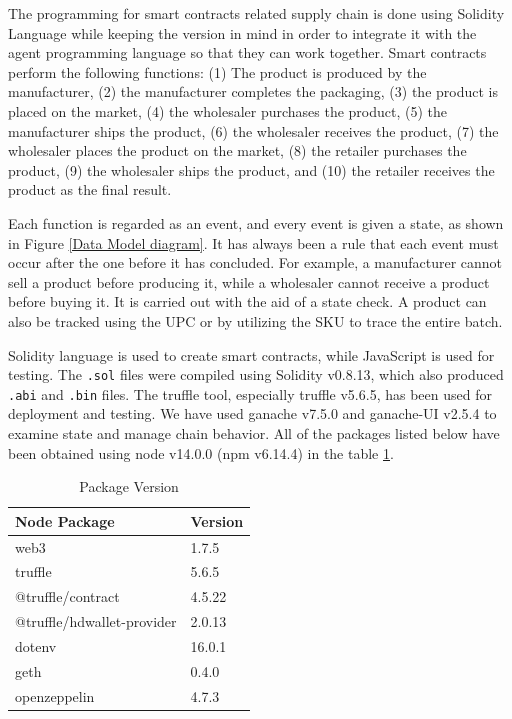 \vspace{.5cm}

The programming for smart contracts related supply chain is done using Solidity Language while keeping the version in mind in order to integrate it with the agent programming language so that they can work together. Smart contracts perform the following functions: (1) The product is produced by the manufacturer, (2) the manufacturer completes the packaging, (3) the product is placed on the market, (4) the wholesaler purchases the product, (5) the manufacturer ships the product, (6) the wholesaler receives the product, (7) the wholesaler places the product on the market, (8) the retailer purchases the product, (9) the wholesaler ships the product, and (10) the retailer receives the product as the final result.

\vspace{.5cm}

Each function is regarded as an event, and every event is given a state, as shown in Figure \ref{Data Model diagram}. It has always been a rule that each event must occur after the one before it has concluded. For example, a manufacturer cannot sell a product before producing it, while a wholesaler cannot receive a product before buying it. It is carried out with the aid of a state check. A product can also be tracked using the \ac{UPC} or by utilizing the \ac{SKU} to trace the entire batch.

\vspace{.5cm}

Solidity language is used to create smart contracts, while JavaScript is used for testing. The \texttt{.sol} files were compiled using Solidity v0.8.13, which also produced \texttt{.abi} and \texttt{.bin} files. The truffle tool, especially truffle v5.6.5, has been used for deployment and testing. We have used ganache v7.5.0 and ganache-UI v2.5.4 to examine state and manage chain behavior. All of the packages listed below have been obtained using node v14.0.0 (npm v6.14.4) in the table \ref{Package Version}.
    
\vspace{.5cm}

\begin{table}[h]
\small
\centering
\caption{Package Version}
\label{Package Version}
\begin{tabular}{|l| l|}
\hline
\textbf{Node Package} & \textbf{Version} \\ 
\hline\hline
web3 & 1.7.5\\ \hline
truffle & 5.6.5\\ \hline 
@truffle/contract & 4.5.22\\ \hline 
@truffle/hdwallet-provider & 2.0.13\\ \hline
dotenv & 16.0.1\\ \hline
geth & 0.4.0\\ \hline
openzeppelin & 4.7.3\\ \hline
\hline 
\end{tabular}
\end{table}

